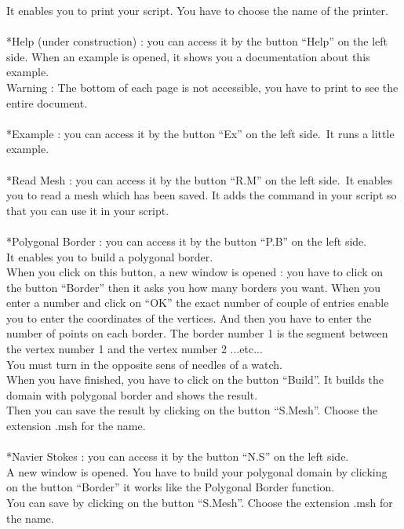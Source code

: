 \documentclass[a4paper]{report}
\begin{document}
It enables you to print your script. You have to choose the name of the printer.\\
\\
*Help (under construction) : you can access it by the button ``Help'' on the left side. When an example is opened, it shows you a documentation about this example.\\
Warning : The bottom of each page is not accessible, you have to print to see the entire document.\\
\\
*Example : you can access it by the button ``Ex'' on the left side.\
It runs a little example.\\
\\
*Read Mesh : you can access it by the button ``R.M'' on the left side.\
It enables you to read a mesh which has been saved. It adds the command in your script so that you can use it in your script.\\
\\
*Polygonal Border : you can access it by the button ``P.B'' on the left side.\\
It enables you to build a polygonal border.\\
When you click on this button, a new window is opened : you have to click on the button ``Border'' then it asks you how many borders you want. When you enter a number and click on ``OK'' the exact number of couple of entries enable you to enter the coordinates of the vertices. And then you have to enter the number of points on each border. The border number 1 is the segment between the vertex number 1 and the vertex number 2 ...etc...\\
You must turn in the opposite sens of needles of a watch.\\
When you have finished, you have to click on the button ``Build''. It builds the domain with polygonal border and shows the result.\\
Then you can save the result by clicking on the button ``S.Mesh''. Choose the extension .msh for the name.\\
\\
*Navier Stokes : you can access it by the button ``N.S'' on the left side.\\
A new window is opened. You have to build your polygonal domain by clicking on the button ``Border'' it works like the Polygonal Border function.\\
You can save by clicking on the button ``S.Mesh''. Choose the extension .msh for the name.\\
\end{document}
